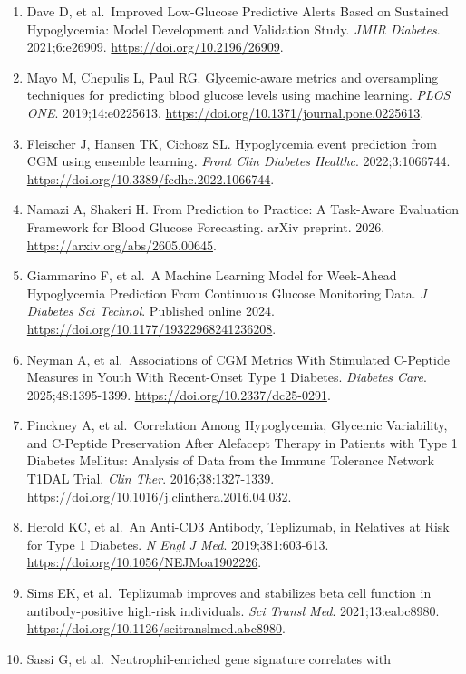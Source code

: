 \documentclass[
  american,
  11pt,
  letterpaper,
]{article}
\begin{document}
\begin{enumerate}
\def\labelenumi{\arabic{enumi}.}
\item
  Dave D, et al.~Improved Low-Glucose Predictive Alerts Based on
  Sustained Hypoglycemia: Model Development and Validation Study.
  \emph{JMIR Diabetes}. 2021;6:e26909.
  \url{https://doi.org/10.2196/26909}.
\item
  Mayo M, Chepulis L, Paul RG. Glycemic-aware metrics and oversampling
  techniques for predicting blood glucose levels using machine learning.
  \emph{PLOS ONE}. 2019;14:e0225613.
  \url{https://doi.org/10.1371/journal.pone.0225613}.
\item
  Fleischer J, Hansen TK, Cichosz SL. Hypoglycemia event prediction from
  CGM using ensemble learning. \emph{Front Clin Diabetes Healthc}.
  2022;3:1066744. \url{https://doi.org/10.3389/fcdhc.2022.1066744}.
\item
  Namazi A, Shakeri H. From Prediction to Practice: A Task-Aware
  Evaluation Framework for Blood Glucose Forecasting. arXiv preprint.
  2026. \url{https://arxiv.org/abs/2605.00645}.
\item
  Giammarino F, et al.~A Machine Learning Model for Week-Ahead
  Hypoglycemia Prediction From Continuous Glucose Monitoring Data.
  \emph{J Diabetes Sci Technol}. Published online 2024.
  \url{https://doi.org/10.1177/19322968241236208}.
\item
  Neyman A, et al.~Associations of CGM Metrics With Stimulated C-Peptide
  Measures in Youth With Recent-Onset Type 1 Diabetes. \emph{Diabetes
  Care}. 2025;48:1395-1399. \url{https://doi.org/10.2337/dc25-0291}.
\item
  Pinckney A, et al.~Correlation Among Hypoglycemia, Glycemic
  Variability, and C-Peptide Preservation After Alefacept Therapy in
  Patients with Type 1 Diabetes Mellitus: Analysis of Data from the
  Immune Tolerance Network T1DAL Trial. \emph{Clin Ther}.
  2016;38:1327-1339.
  \url{https://doi.org/10.1016/j.clinthera.2016.04.032}.
\item
  Herold KC, et al.~An Anti-CD3 Antibody, Teplizumab, in Relatives at
  Risk for Type 1 Diabetes. \emph{N Engl J Med}. 2019;381:603-613.
  \url{https://doi.org/10.1056/NEJMoa1902226}.
\item
  Sims EK, et al.~Teplizumab improves and stabilizes beta cell function
  in antibody-positive high-risk individuals. \emph{Sci Transl Med}.
  2021;13:eabc8980. \url{https://doi.org/10.1126/scitranslmed.abc8980}.
\item
  Sassi G, et al.~Neutrophil-enriched gene signature correlates with

\end{enumerate}
\end{document}
